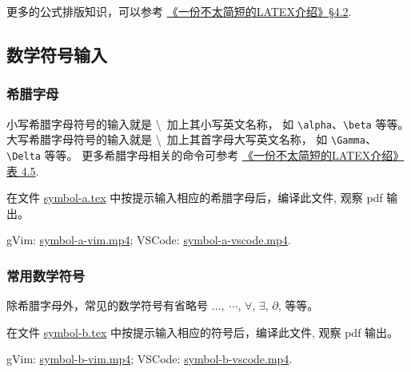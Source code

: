 \documentclass[
    11pt,
    base=hide,
    cite=authoryear,
    device=phone,
    lang=cn,
    mode=simple,
    result=answer,
    toc=onecol,
]{elegantsierxue310}
\begin{document}
更多的公式排版知识，可以参考 \hyperlink{books/lshort-zh-cn.pdf.51}%
{《一份不太简短的LATEX介绍》\S4.2}.

\subsection{数学符号输入}%
\label{sub:latex-math-symbol}

\subsubsection{希腊字母}%
\label{ssub:greek-letter}

小写希腊字母符号的输入就是 \textbackslash~加上其小写英文名称，
如 \lstinline{\alpha}、\lstinline{\beta} 等等。
大写希腊字母符号的输入就是 \textbackslash~加上其首字母大写英文名称，
如 \lstinline{\Gamma}、\lstinline{\Delta} 等等。
更多希腊字母相关的命令可参考
\hyperlink{books/lshort-zh-cn.pdf.66}%
{《一份不太简短的LATEX介绍》表 4.5}.
\begin{exercise}\label{ex:symbol-a}
    在文件
    \href{learn-latex/basic-03/symbol-a.tex}{symbol-a.tex}
    中按提示输入相应的希腊字母后，编译此文件, 观察 pdf 输出。
\end{exercise}
\begin{cast}\label{cast:symbol-a}
    gVim: \href{media/casts/symbol-a-vim.mp4}{symbol-a-vim.mp4};
    VSCode: \href{media/casts/symbol-a-vscode.mp4}{symbol-a-vscode.mp4}.
\end{cast}

\subsubsection{常用数学符号}%
\label{ssub:math-gneral}

除希腊字母外，常见的数学符号有省略号 \(\dots,\;\cdots\), \(\forall\),
\(\exists\), \(\partial\), 等等。
\begin{exercise}\label{ex:symbol-b}
    在文件
    \href{learn-latex/basic-03/symbol-b.tex}{symbol-b.tex}
    中按提示输入相应的符号后，编译此文件, 观察 pdf 输出。
\end{exercise}
\begin{cast}\label{cast:symbol-b}
    gVim: \href{media/casts/symbol-b-vim.mp4}{symbol-b-vim.mp4};
    VSCode: \href{media/casts/symbol-b-vscode.mp4}{symbol-b-vscode.mp4}.
\end{cast}
\end{document}
